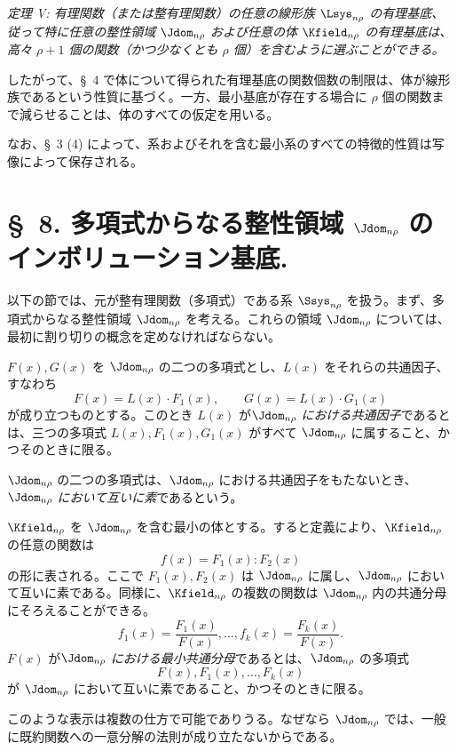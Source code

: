 \documentclass[11pt]{article}
\begin{document}
\emph{定理 V: 有理関数（または整有理関数）の任意の線形族 $\Lsys_{n\rho}$ の有理基底、従って特に任意の整性領域 $\Jdom_{n\rho}$ および任意の体 $\Kfield_{n\rho}$ の有理基底は、高々 $\rho+1$ 個の関数（かつ少なくとも $\rho$ 個）を含むように選ぶことができる。}

したがって、\S\ 4 で体について得られた有理基底の関数個数の制限は、体が線形族であるという性質に基づく。一方、最小基底が存在する場合に $\rho$ 個の関数まで減らせることは、体のすべての仮定を用いる。

なお、\S\ 3 (4) によって、系およびそれを含む最小系のすべての特徴的性質は写像によって保存される。

\section*{\S\ 8. 多項式からなる整性領域 $\Jdom_{n\rho}$ のインボリューション基底.}

以下の節では、元が整有理関数（多項式）である系 $\Ssys_{n\rho}$ を扱う。まず、多項式からなる整性領域 $\Jdom_{n\rho}$ を考える。これらの領域 $\Jdom_{n\rho}$ については、最初に割り切りの概念を定めなければならない。

$F(x),G(x)$ を $\Jdom_{n\rho}$ の二つの多項式とし、$L(x)$ をそれらの共通因子、すなわち
\[
  F(x)=L(x)\cdot F_1(x),\qquad G(x)=L(x)\cdot G_1(x)
\]
が成り立つものとする。このとき $L(x)$ が\emph{$\Jdom_{n\rho}$ における共通因子}であるとは、三つの多項式 $L(x),F_1(x),G_1(x)$ がすべて $\Jdom_{n\rho}$ に属すること、かつそのときに限る。

$\Jdom_{n\rho}$ の二つの多項式は、$\Jdom_{n\rho}$ における共通因子をもたないとき、\emph{$\Jdom_{n\rho}$ において互いに素}であるという。

$\Kfield_{n\rho}$ を $\Jdom_{n\rho}$ を含む最小の体とする。すると定義により、$\Kfield_{n\rho}$ の任意の関数は
\[
  f(x)=F_1(x):F_2(x)
\]
の形に表される。ここで $F_1(x),F_2(x)$ は $\Jdom_{n\rho}$ に属し、$\Jdom_{n\rho}$ において互いに素である。同様に、$\Kfield_{n\rho}$ の複数の関数は $\Jdom_{n\rho}$ 内の共通分母にそろえることができる。
\[
  f_1(x)=\frac{F_1(x)}{F(x)},\ldots,
  f_k(x)=\frac{F_k(x)}{F(x)}.
\]
$F(x)$ が\emph{$\Jdom_{n\rho}$ における最小共通分母}であるとは、$\Jdom_{n\rho}$ の多項式
\[
  F(x),F_1(x),\ldots,F_k(x)
\]
が $\Jdom_{n\rho}$ において互いに素であること、かつそのときに限る。

このような表示は複数の仕方で可能でありうる。なぜなら $\Jdom_{n\rho}$ では、一般に既約関数への一意分解の法則が成り立たないからである。
\end{document}
